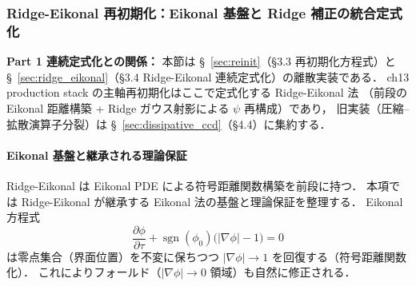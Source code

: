 \subsubsection{Ridge-Eikonal 再初期化：Eikonal 基盤と Ridge 補正の統合定式化}
\label{sec:xi_sdf_reinit}
\label{sec:eikonal_reinit}%

\noindent\textbf{Part 1 連続定式化との関係：}
本節は §~\ref{sec:reinit}（§3.3 再初期化方程式）と
§~\ref{sec:ridge_eikonal}（§3.4 Ridge-Eikonal 連続定式化）の離散実装である．
ch13 production stack の主軸再初期化はここで定式化する Ridge-Eikonal 法
（前段の Eikonal 距離構築 + Ridge ガウス射影による $\psi$ 再構成）であり，
旧実装（圧縮--拡散演算子分裂）は §~\ref{sec:dissipative_ccd}（§4.4）に集約する．

\paragraph*{Eikonal 基盤と継承される理論保証}
Ridge-Eikonal は Eikonal PDE による符号距離関数構築を前段に持つ．
本項では Ridge-Eikonal が継承する Eikonal 法の基盤と理論保証を整理する．
Eikonal 方程式 \cite{Sussman1994}
\begin{equation}
  \frac{\partial\phi}{\partial\tau} + \operatorname{sgn}(\phi_0)\bigl(|\nabla\phi| - 1\bigr) = 0
  \label{eq:eikonal_pde}
\end{equation}
は零点集合（界面位置）を不変に保ちつつ $|\nabla\phi| \to 1$ を回復する（符号距離関数化）．
これによりフォールド（$|\nabla\phi|\to 0$ 領域）も自然に修正される．

